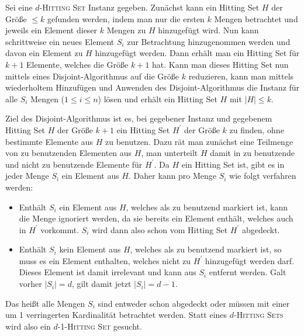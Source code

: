 

\DeclareMathOperator{\vc}{vc}




Sei eine $d$-\textsc{Hitting Set} Instanz gegeben. Zunächst kann ein Hitting Set $H$ der Größe $\leq k$ gefunden werden, indem man nur die ersten $k$ Mengen betrachtet und jeweils ein Element dieser $k$ Mengen zu $H$ hinzugefügt wird. Nun kann schrittweise ein neues Element $S_i$ zur Betrachtung hinzugenommen werden und davon ein Element zu $H$ hinzugefügt werden. Dann erhält man ein Hitting Set für $k+1$ Elemente, welches die Größe $k+1$ hat. Kann man dieses Hitting Set nun mittels eines Disjoint-Algorithmus auf die Größe $k$ reduzieren, kann man mittels wiederholtem Hinzufügen und Anwenden des Disjoint-Algorithmus die Instanz für alle $S_i$ Mengen ($1 \leq i \leq n$) lösen und erhält ein Hitting Set $H$ mit $|H| \leq k$.

Ziel des Disjoint-Algorithmus ist es, bei gegebener Instanz und gegebenem Hitting Set $H$ der Größe $k+1$ ein Hitting Set $H^\prime$ der Größe $k$ zu finden, ohne bestimmte Elemente aus $H$ zu benutzen. Dazu rät man zunächst eine Teilmenge von zu benutzenden Elementen aus $H$, man unterteilt $H$ damit in zu benutzende und nicht zu benutzende Elemente für $H^\prime$. Da $H$ ein Hitting Set ist, gibt es in jeder Menge $S_i$ ein Element aus $H$. Daher kann pro Menge $S_i$ wie folgt verfahren werden:

\begin{itemize}
\item Enthält $S_i$ ein Element aus $H$, welches als zu benutzend markiert ist, kann die Menge ignoriert werden, da sie bereits ein Element enthält, welches auch in $H^\prime$ vorkommt. $S_i$ wird dann also schon vom Hitting Set $H^\prime$ abgedeckt.

\item Enthält $S_i$ kein Element aus $H$, welches als zu benutzend markiert ist, so muss es ein Element enthalten, welches nicht zu $H^\prime$ hinzugefügt werden darf. Dieses Element ist damit irrelevant und kann aus $S_i$ entfernt werden. Galt vorher $|S_i| = d$, gilt damit jetzt $|S_i|=d-1$.

\end{itemize}

Das heißt alle Mengen $S_i$ sind entweder schon abgedeckt oder müssen mit einer um 1 verringerten Kardinalität betrachtet werden. Statt eines $d$-\textsc{Hitting Sets} wird also ein $d$-1-\textsc{Hitting Set} gesucht. 

